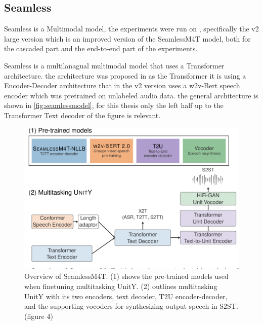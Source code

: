 \subsection{Seamless}

Seamless is a Multimodal model, the experiments were run on \cite{seamless2023}, specifically the v2 large version which is an improved version of the SeamlessM4T model, both for the cascaded part and the end-to-end part of the experiments.

Seamless is a multilanagual multimodal model that uses a Transformer architecture. 
the architecture was proposed in \cite{seamless2023}
as the Transformer it is using a Encoder-Decoder architecture that in the v2 version uses a w2v-Bert speech encoder which was pretrained on unlabeled audio data. 
the general architecture is shown in \autoref{fig:seamlessmodel}, for this thesis only the left half up to the Transformer Text decoder of the figure is relevant. 

\begin{figure}
        \centering%
        \includegraphics[width=0.5\linewidth]{Latex//sections/images/seamlessmodel.png}
        \caption{Overview of SeamlessM4T. (1) shows the pre-trained models used when finetuning multitasking UnitY. (2) outlines multitasking UnitY with its two encoders, text decoder, T2U encoder-decoder, and the supporting vocoders for synthesizing output speech in S2ST. \cite{seamless2023}(figure 4)}
        \label{fig:seamlessmodel}
\end{figure}
    
